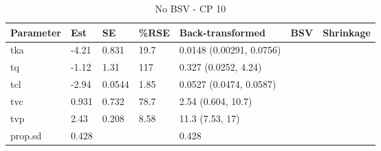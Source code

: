 \begin{table}
\centering\centering
\caption{No BSV - CP 10}
\centering
\fontsize{8}{10}\selectfont
\begin{tabular}[t]{lllllll}
\toprule
\textbf{Parameter} & \textbf{Est} & \textbf{SE} & \textbf{\%RSE} & \textbf{Back-transformed} & \textbf{BSV} & \textbf{Shrinkage}\\
\midrule
tka & -4.21 & 0.831 & 19.7 & 0.0148 (0.00291, 0.0756) &  & \\
\midrule
tq & -1.12 & 1.31 & 117 & 0.327 (0.0252, 4.24) &  & \\
\midrule
tcl & -2.94 & 0.0544 & 1.85 & 0.0527 (0.0474, 0.0587) &  & \\
\midrule
tvc & 0.931 & 0.732 & 78.7 & 2.54 (0.604, 10.7) &  & \\
\midrule
tvp & 2.43 & 0.208 & 8.58 & 11.3 (7.53, 17) &  & \\
\midrule
prop.sd & 0.428 &  &  & 0.428 &  & \\
\bottomrule
\end{tabular}
\end{table}